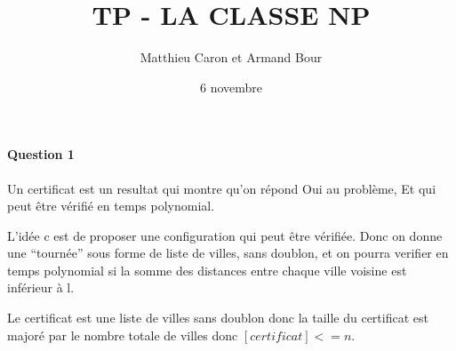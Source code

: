 \documentclass[a4paper,10pt]{article}
\title{TP - LA CLASSE NP}
\author{Matthieu Caron et Armand Bour}
\date{6 novembre}
\begin{document}
\maketitle

\paragraph{Question 1}
Un certificat est un resultat qui montre qu'on répond Oui au problème,
Et qui peut être vérifié en temps polynomial.

L'idée c est de proposer une configuration qui peut être vérifiée.
Donc on donne une ``tournée'' sous forme de liste de villes, sans doublon,
et on pourra verifier en temps polynomial si la somme des distances entre chaque ville
voisine est inférieur à l.

Le certificat est une liste de villes sans doublon donc la taille du certificat est majoré
par le nombre totale de villes donc $[certificat]<=n$.
\end{document}
